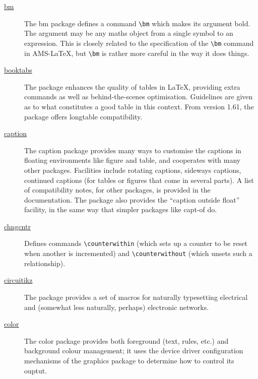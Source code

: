 \begin{description}
	\item[\href{https://www.ctan.org/pkg/bm}{bm}] The bm package defines a command \verb|\bm| which makes its argument bold. The argument may be any maths object from a single symbol to an expression. This is closely related to the specification of the \verb|\bm| command in AMS-{\LaTeX}, but \verb|\bm| is rather more careful in the way it does things. \cite{CTANTeam.2020bh}
	
	\item[\href{https://www.ctan.org/pkg/booktabs}{booktabs}] The package enhances the quality of tables in {\LaTeX}, providing extra commands as well as behind-the-scenes optimisation. Guidelines are given as to what constitutes a good table in this context. From version 1.61, the package offers longtable compatibility. \cite{CTANTeam.2020bc}
	
	\item[\href{https://www.ctan.org/pkg/caption}{caption}] The caption package provides many ways to customise the captions in floating environments like figure and table, and cooperates with many other packages. Facilities include rotating captions, sideways captions, continued captions (for tables or figures that come in several parts). A list of compatibility notes, for other packages, is provided in the documentation. The package also provides the \enquote{caption outside float} facility, in the same way that simpler packages like capt-of do. \cite{CTANTeam.2020ar}
	
	\item[\href{https://www.ctan.org/pkg/chngcntr}{chngcntr}] Defines commands \verb|\counterwithin| (which sets up a counter to be reset when another is incremented) and \verb|\counterwithout| (which unsets such a relationship). \cite{CTANTeam.2020b}
	
	\item[\href{https://www.ctan.org/pkg/circuitikz}{circuitikz}] The package provides a set of macros for naturally typesetting electrical and (somewhat less naturally, perhaps) electronic networks. \cite{CTANTeam.2020ax}
	
	\item[\href{https://www.ctan.org/pkg/color}{color}] The color package provides both foreground (text, rules, etc.) and background colour management; it uses the device driver configuration mechanisms of the graphics package to determine how to control its ouptut. \cite{CTANTeam.2020at}
	

\end{description}
